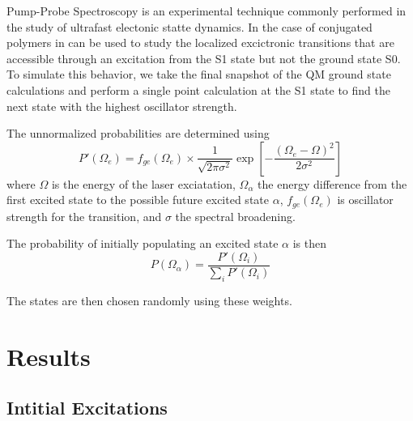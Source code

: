 Pump-Probe Spectroscopy is an experimental technique commonly performed in the
study of ultrafast electonic statte dynamics. In the case of conjugated polymers
in can be used to study the localized excictronic transitions that are
accessible through an excitation from the S1 state but not the ground state S0.
To simulate this behavior, we take the final snapshot of the QM ground state
calculations and perform a single point calculation at the S1 state to find the
next state with the highest oscillator strength.

The unnormalized probabilities are determined using
\begin{equation}
  P'(\Omega_e) = f_{ge}(\Omega_e) \times \frac{1}{\sqrt{2\pi \sigma^2}} \exp \left[ - \frac{(\Omega_e - \Omega)^2}{2\sigma^2} \right]
\end{equation}
where \(\Omega\) is the energy of the laser exciatation, \(\Omega_\alpha\) the energy difference from the first excited state to the possible future excited state \(\alpha\), \(f_{ge}(\Omega_e)\) is oscillator strength for the transition, and \(\sigma\) the spectral broadening.  

The probability of initially populating an excited state \(\alpha\) is then
\begin{equation}
  P(\Omega_\alpha) = \frac{P'(\Omega_i)}{\sum_i P'(\Omega_i)}
\end{equation}

The states are then chosen randomly using these weights.

\section{Results}

\subsection{Intitial Excitations}

